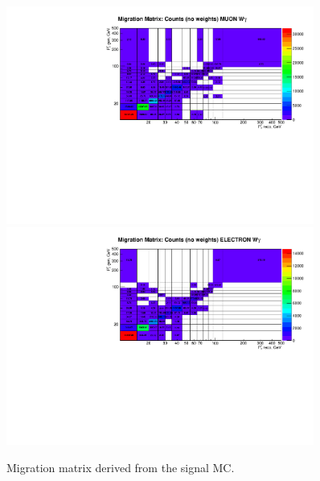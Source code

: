 \begin{figure}[htb]
  \begin{center}
   \includegraphics[width=0.90\textwidth]{../figs/figs_v11/MUON_WGamma/Constants/cMigrMatrix_MUON_WGamma__yield_pm_stat.pdf}\\
\includegraphics[width=0.90\textwidth]{../figs/figs_v11/ELECTRON_WGamma/Constants/cMigrMatrix_ELECTRON_WGamma__yield_pm_stat.pdf}
  \caption{Migration matrix derived from the signal MC.}
  \label{fig:migrMatrices_Wg}
  \end{center}
\end{figure}

